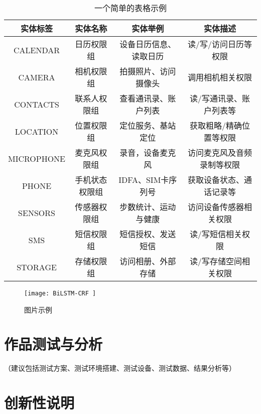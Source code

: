 \documentclass{cumcmthesis}
\numberwithin{equation}{section} %
\numberwithin{figure}{section} %
\numberwithin{table}{section} %
\begin{document}
\begin{table}[htbp]
	\centering
	\caption{一个简单的表格示例}
	\begin{tabular}{cccc}
		\toprule[1pt]
		\toprule[1pt]
		\textbf{实体标签} & \textbf{实体名称} & \textbf{实体举例} & \textbf{实体描述}\\
		\midrule
		\midrule
		CALENDAR & 日历权限组 & 设备日历信息、读取日历 & 读/写/访问日历等权限 \\
		\hline
		CAMERA & 相机权限组 & 拍摄照片、访问摄像头 & 调用相机相关权限 \\	
		\hline
		CONTACTS & 联系人权限组 & 查看通讯录、账户列表 & 读/写通讯录、账户列表等 \\
		\hline
		LOCATION & 位置权限组 & 定位服务、基站定位 & 获取粗略/精确位置等权限 \\
		\hline
		MICROPHONE & 麦克风权限组 & 录音，设备麦克风 & 访问麦克风及音频录制等权限 \\
		\hline
		PHONE & 手机状态权限组 & IDFA、SIM卡序列号 & 获取设备状态、通话记录等 \\
		\hline
		SENSORS & 传感器权限组 & 步数统计、运动与健康 & 访问设备传感器相关权限 \\
		\hline
		SMS & 短信权限组 & 短信授权、发送短信 & 读/写短信相关权限 \\
		\hline
		STORAGE & 存储权限组 & 访问相册、外部存储 & 读/写存储空间相关权限 \\
		\bottomrule[1pt]
		\bottomrule[1pt]
	\end{tabular}
	\label{tab:实体标签}%
\end{table}%

\begin{figure}[h]
	\centering
	\texttt{[image:  BiLSTM-CRF ]}
	\caption{ 图片示例 }
	\label{fig:BiLSTM-CRF}
\end{figure}

\newpage

\section{作品测试与分析}

（建议包括测试方案、测试环境搭建、测试设备、测试数据、结果分析等）


\newpage

\section{创新性说明}
\end{document}
